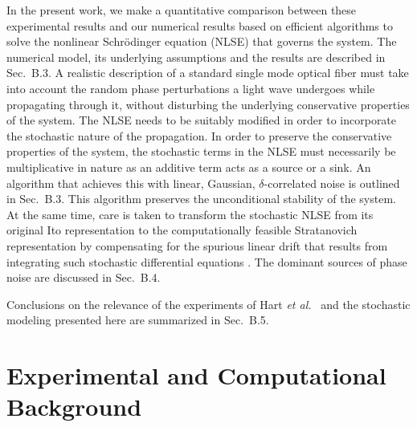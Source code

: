 In the present work, we make a quantitative comparison between these 
experimental results and our numerical results based on efficient algorithms 
\cite{Agrawal2} to solve the nonlinear Schr\"odinger equation (NLSE) that
governs the system. The numerical model, its underlying assumptions and
the results are described in Sec.\ B.3. A realistic description of a 
standard single mode optical fiber must take into account the random phase 
perturbations a light wave undergoes while propagating through it, without 
disturbing the underlying conservative properties of the system. The NLSE 
needs to be suitably modified in order to incorporate the stochastic nature 
of the propagation. In order to preserve the conservative properties of the 
system, the stochastic terms in the NLSE must necessarily be multiplicative in 
nature as an additive term acts as a source or a sink. An algorithm that 
achieves this with linear, Gaussian, $\delta$-correlated noise is outlined in 
Sec.\ B.3. This algorithm preserves the unconditional stability of the 
system. At the same time, care is taken to transform the stochastic NLSE from 
its original Ito representation \cite{ito} to the computationally feasible Stratanovich 
representation \cite{stratanovich} by compensating for the 
spurious linear drift that results from integrating such stochastic 
differential equations \cite{risken,werner2,drummond1,carter3}. The dominant 
sources of phase noise are discussed in Sec.\ B.4. 

Conclusions on the relevance of the experiments of Hart {\it et al.}\ \cite{hart1} 
and the stochastic modeling presented here are summarized in Sec.\ B.5.    

\section{Experimental and Computational Background}

